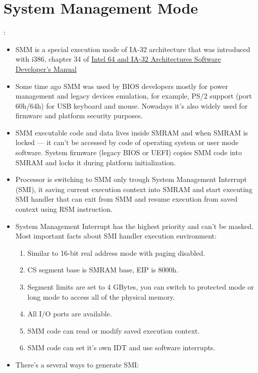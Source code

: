 \section{System Management Mode}
\begin{note}:
\begin{itemize}
	\item SMM is a special execution mode of IA-32 architecture that was introduced with i386, chapter 34 of \href{http://www.intel.com/content/www/us/en/processors/architectures-software-developer-manuals.html}{Intel 64 and IA-32 Architectures Software Developer’s Manual}
	\item Some time ago SMM was used by BIOS developers mostly for power management and legacy devices emulation, for example, PS/2 support (port 60h/64h) for USB keyboard and mouse. Nowadays it's also widely used for firmware and platform security purposes.
	\item SMM executable code and data lives inside SMRAM and when SMRAM is locked — it can't be accessed by code of operating system or user mode software. System firmware (legacy BIOS or UEFI) copies SMM code into SMRAM and locks it during platform initialization.
	\item Processor is switching to SMM only trough System Management Interrupt (SMI), it saving current execution context into SMRAM and start executing SMI handler that can exit from SMM and resume execution from saved context using RSM instruction.
	\item System Management Interrupt has the highest priority and can’t be masked. Most important facts about SMI handler execution environment:
	\begin{enumerate}
		\item Similar to 16-bit real address mode with paging disabled.
		\item CS segment base is SMRAM base, EIP is 8000h.
		\item Segment limits are set to 4 GBytes, you can switch to protected mode or long mode to access all of the physical memory.
		\item All I/O ports are available.
		\item SMM code can read or modify saved execution context.
		\item SMM code can set it’s own IDT and use software interrupts.
	\end{enumerate}
	\item There’s a several ways to generate SMI:
	\begin{enumerate}

\end{enumerate}
\end{itemize}
\end{note}
